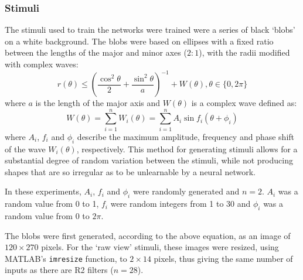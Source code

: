 \documentclass[10pt]{article}
\newcommand{\Matlab}{MATLAB}
\begin{document}
\subsubsection{Stimuli}
\label{sec:methods:stimuli}
The stimuli used to train the networks were trained were a series of black `blobs' on a white background.
The blobs were based on ellipses with a fixed ratio between the lengths of the major and minor axes ($2:1$), with the radii modified with complex waves:
$$
r(\theta) \le \left(\frac{\cos^2 \theta}{2} + \frac{\sin^2 \theta}{a} \right)^{-1} + W(\theta), \theta \in \{0, 2\pi\}
$$
where $a$ is the length of the major axis and $W(\theta)$ is a complex wave defined as:
$$
W(\theta) = \sum_{i=1}^n W_i(\theta) = \sum_{i=1}^n A_i \sin f_i (\theta+\phi_i) 
$$
where $A_i$, $f_i$ and $\phi_i$ describe the maximum amplitude, frequency and phase shift of the wave $W_i(\theta)$, respectively.
This method for generating stimuli allows for a substantial degree of random variation between the stimuli, while not producing shapes that are so irregular as to be unlearnable by a neural network.

In these experiments, $A_i$, $f_i$ and $\phi_i$ were randomly generated and $n=2$.
$A_i$ was a random value from 0 to 1, $f_i$ were random integers from 1 to 30 and $\phi_i$ was a random value from 0 to $2\pi$.
\begin{comment}
nvar = 1000;
nwave = 2;
maxfreq = 30;
maxamp = 1;
\end{comment}

The blobs were first generated, according to the above equation, as an image of $120\times 270$ pixels.
For the `raw view' stimuli, these images were resized, using \Matlab's \texttt{imresize} function, to $2\times 14$ pixels, thus giving the same number of inputs as there are R2 filters ($n=28$).

\begin{comment}
\subsubsection*{Grading performance of neural networks}
The performance of neural networks was graded by calculating the \ac{rms} difference between the matrix of true values for the parameters with the network's output:
$$
E(\mathbf{y},\mathbf{t}) = \sqrt{\frac{\sum\limits_{i=1}^{n} (\mathbf{y}_i-\mathbf{t}_i)^2}{n}}
$$
where $E(\mathbf{y},\mathbf{t})$ is the mean error score, computed from the vector of outputs given by the network, $\mathbf{y}$, and the vector of true values, $\mathbf{t}$.
Hence, for a network that computed the values of all parameters accurately, a graph of the network's output \emph{vs.} the true values would give the line $y=x$ and an error score of 0 over the whole range of values.
\end{comment}
\end{document}
